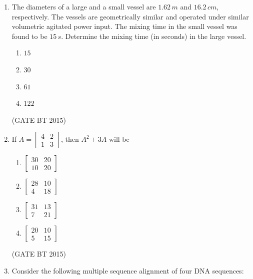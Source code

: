 \documentclass[journal,12pt,onecolumn]{IEEEtran}
\begin{document}
\begin{enumerate}[label=\textbf{Q.\arabic*}]
\item The diameters of a large and a small vessel are $1.62 \, m$ and $16.2 \, cm$, respectively. The vessels are geometrically similar and operated under similar volumetric agitated power input. The mixing time in the small vessel was found to be $15 \, s$. Determine the mixing time (in seconds) in the large vessel.  

\begin{multicols}{4}
\begin{enumerate}
    \item $15$  
    \item $30$  
    \item $61$  
    \item $122$  
\end{enumerate}
\end{multicols}\hfill (GATE BT 2015)




\item If $A = \begin{bmatrix} 4 & 2 \\ 1 & 3 \end{bmatrix}$, then $A^{2} + 3A$ will be  

\begin{multicols}{2}
\begin{enumerate}
    \item $\begin{bmatrix} 30 & 20 \\ 10 & 20 \end{bmatrix}$  
    \item $\begin{bmatrix} 28 & 10 \\ 4 & 18 \end{bmatrix}$  
    \item $\begin{bmatrix} 31 & 13 \\ 7 & 21 \end{bmatrix}$  
    \item $\begin{bmatrix} 20 & 10 \\ 5 & 15 \end{bmatrix}$  
\end{enumerate}
\end{multicols}\hfill (GATE BT 2015)


\item Consider the following multiple sequence alignment of four DNA sequences:  


\end{enumerate}
\end{document}
